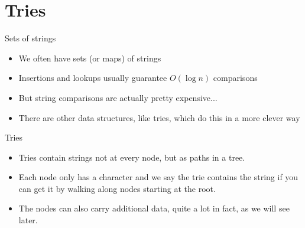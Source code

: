 \documentclass{beamer}
\begin{document}
\section*{Tries}

\begin{frame}[plain]{Sets of strings}
    \begin{itemize}
\item We often have sets (or maps) of strings
\item Insertions and lookups usually guarantee $O(\log n)$ comparisons
    \vspace{10pt}
\item But string comparisons are actually pretty expensive...
    \vspace{10pt}
\item There are other data structures, like tries, which do this in a more clever way
    \end{itemize}
\end{frame}

\begin{frame}[plain]{Tries}
	\begin{itemize}
        \item Tries contain strings not at every node, but as paths in a tree.
        \item Each node only has a character and we say the trie contains the string if you can get it by walking along nodes starting at the root.
        \item The nodes can also carry additional data, quite a lot in fact, as we will see later.
    \end{itemize}
\end{frame}
\end{document}
